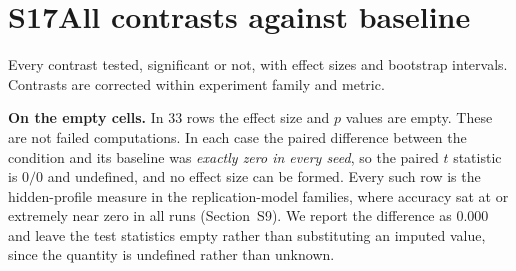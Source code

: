 \documentclass[11pt]{article}
\begin{document}
\medskip

\section*{S17\quad All contrasts against baseline}
Every contrast tested, significant or not, with effect sizes and bootstrap intervals. Contrasts are corrected within experiment family and metric.

\textbf{On the empty cells.} In 33 rows the effect size and $p$ values are empty. These are not failed computations. In each case the paired difference between the condition and its baseline was \emph{exactly zero in every seed}, so the paired $t$ statistic is $0/0$ and undefined, and no effect size can be formed. Every such row is the hidden-profile measure in the replication-model families, where accuracy sat at or extremely near zero in all runs (Section~S9). We report the difference as $0.000$ and leave the test statistics empty rather than substituting an imputed value, since the quantity is undefined rather than unknown.
\end{document}
